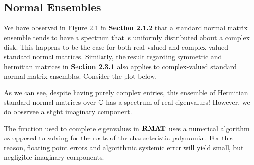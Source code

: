 \subsection{Normal Ensembles}

%


We have observed in Figure 2.1 in \textbf{Section 2.1.2} that a standard normal matrix ensemble tends to have a spectrum that is uniformly distributed about a complex disk. This happens to be the case for both real-valued and complex-valued standard normal matrices. Similarly, the result regarding symmetric and hermitian matrices in \textbf{Section 2.3.1} also applies to complex-valued standard normal matrix ensembles. Consider the plot below.


As we can see, despite having purely complex entries, this ensemble of Hermitian standard normal matrices over $\mathbb{C}$ has a spectrum of real eigenvalues!
However, we do observee a slight imaginary component.

\begin{remark}
The  function used to complete eigenvalues in ${\textbf{RMAT}}$ uses a numerical algorithm as opposed to solving for the roots of the characteristic polynomial.
For this reason, floating point errors and algorithmic systemic error will yield small, but negligible imaginary components.
\end{remark}
